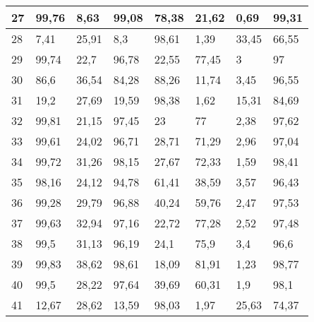 \begin{longtable}[c]{|l|l|l|l|l|l|l|l|}
27              & 99,76        & 8,63         & 99,08       & 78,38         & 21,62         & 0,69          & 99,31         \\ \hline
28              & 7,41         & 25,91        & 8,3         & 98,61         & 1,39          & 33,45         & 66,55         \\ \hline
29              & 99,74        & 22,7         & 96,78       & 22,55         & 77,45         & 3             & 97            \\ \hline
30              & 86,6         & 36,54        & 84,28       & 88,26         & 11,74         & 3,45          & 96,55         \\ \hline
31              & 19,2         & 27,69        & 19,59       & 98,38         & 1,62          & 15,31         & 84,69         \\ \hline
32              & 99,81        & 21,15        & 97,45       & 23            & 77            & 2,38          & 97,62         \\ \hline
33              & 99,61        & 24,02        & 96,71       & 28,71         & 71,29         & 2,96          & 97,04         \\ \hline
34              & 99,72        & 31,26        & 98,15       & 27,67         & 72,33         & 1,59          & 98,41         \\ \hline
35              & 98,16        & 24,12        & 94,78       & 61,41         & 38,59         & 3,57          & 96,43         \\ \hline
36              & 99,28        & 29,79        & 96,88       & 40,24         & 59,76         & 2,47          & 97,53         \\ \hline
37              & 99,63        & 32,94        & 97,16       & 22,72         & 77,28         & 2,52          & 97,48         \\ \hline
38              & 99,5         & 31,13        & 96,19       & 24,1          & 75,9          & 3,4           & 96,6          \\ \hline
39              & 99,83        & 38,62        & 98,61       & 18,09         & 81,91         & 1,23          & 98,77         \\ \hline
40              & 99,5         & 28,22        & 97,64       & 39,69         & 60,31         & 1,9           & 98,1          \\ \hline
41              & 12,67        & 28,62        & 13,59       & 98,03         & 1,97          & 25,63         & 74,37         \\ \hline

\end{longtable}
